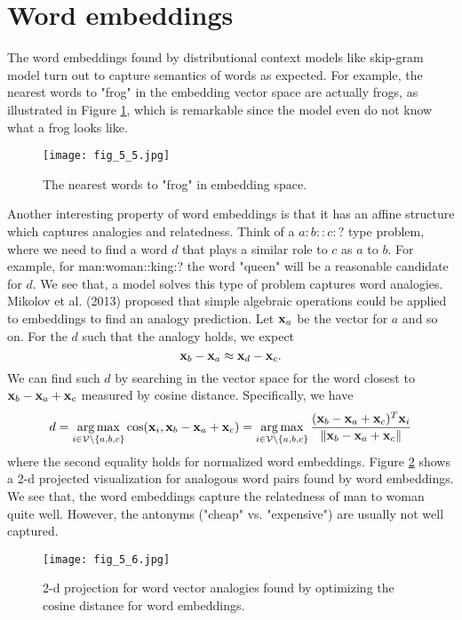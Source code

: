 \documentclass[../main.tex]{subfiles}
\begin{document}
\section{Word embeddings}
The word embeddings found by distributional context models like skip-gram model turn out to capture semantics of words as expected. For example, the nearest words to "frog" in the embedding vector space are actually frogs, as illustrated in Figure \ref{fig_5_5}, which is remarkable since the model even do not know what a frog looks like.
\begin{figure}[h] 
	\centering 
	\texttt{[image: fig\_5\_5.jpg]} 
	\caption{The nearest words to "frog" in embedding space.}\label{fig_5_5}
\end{figure}
\par Another interesting property of word embeddings is that it has an affine structure which captures analogies and relatedness. Think of a $a:b::c:?$ type problem, where we need to find a word $d$ that plays a similar role to $c$ as $a$ to $b$. For example, for man:woman::king:? the word "queen" will be a reasonable candidate for $d$. We see that, a model solves this type of problem captures word analogies. Mikolov et al. (2013) proposed that simple algebraic operations could be applied to embeddings to find an analogy prediction. Let ${\bf x}_a$ be the vector for $a$ and so on. For the $d$ such that the analogy holds, we expect
\begin{equation*}
{\bf x}_b - {\bf x}_a \approx {\bf x}_d-{\bf x}_c.
\end{equation*}
We can find such $d$ by searching in the vector space for the word closest to ${\bf x}_b-{\bf x}_a+{\bf x}_c$ measured by cosine distance. Specifically, we have
\begin{equation*}
d= \mathop{\arg\max}_{i\in \mathcal{V}\backslash\{a,b,c\}} \cos({\bf x}_i, {\bf x}_b-{\bf x}_a+{\bf x}_c) =\mathop{\arg\max}_{i\in \mathcal{V}\backslash\{a,b,c\}}\frac{({\bf x}_b-{\bf x}_a+{\bf x}_c)^T{\bf x}_i}{\|{\bf x}_b-{\bf x}_a+{\bf x}_c\|}
\end{equation*}
where the second equality holds for normalized word embeddings. Figure \ref{fig_5_6} shows a 2-d projected visualization for analogous word pairs found by word embeddings. We see that, the word embeddings capture the relatedness of man to woman quite well. However, the antonyms ("cheap" vs. "expensive") are usually not well captured.
\begin{figure}[h] 
	\centering 
	\texttt{[image: fig\_5\_6.jpg]} 
	\caption{2-d projection for word vector analogies found by optimizing the cosine distance for word embeddings.}\label{fig_5_6}
\end{figure}
\end{document}
